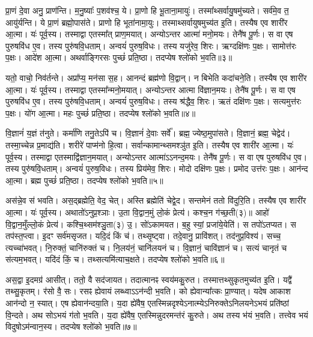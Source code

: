 प्रा॒णं दे॒वा अनु॒ प्राण॑न्ति। 
म॒नु॒ष्याः᳚ प॒शव॑श्च॒ ये। 
प्रा॒णो हि भू॒ताना॒मायुः॑। 
तस्मा᳚थ्सर्वायु॒षमु॑च्यते। 
सर्व॑मे॒व त॒ आयु॑र्\mbox{}यन्ति। 
ये प्रा॒णं ब्रह्मो॒पास॑ते। 
प्राणो हि भूता॑नामा॒युः। 
तस्माथ्सर्वायुषमुच्य॑त इ॒ति। 
तस्यैष एव शारी॑र आ॒त्मा। 
यः॑ पूर्व॒स्य। 
तस्माद्वा एतस्मा᳚त् प्राण॒मयात्। 
अन्योऽन्तर आत्मा॑ मनो॒मयः। 
तेनै॑ष पू॒र्णः। 
स वा एष पुरुषवि॑ध ए॒व। 
तस्य पुरु॑षवि॒धताम्। 
अन्वयं॑ पुरुष॒विधः। 
तस्य यजु॑रेव॒ शिरः। 
ऋग्दक्षि॑णः प॒क्षः। 
सामोत्त॑रः प॒क्षः। 
आदे॑श आ॒त्मा। 
अथर्वाङ्गिरसः पुच्छं॑ प्रति॒ष्ठा। 
तदप्येष श्लो॑को भ॒वति॥३॥

यतो॒ वाचो॒ निव॑र्तन्ते। 
अप्रा᳚प्य॒ मन॑सा स॒ह। 
आनन्दं ब्रह्म॑णो वि॒द्वान्। 
न बिभेति कदा॑चने॒ति। 
तस्यैष एव शारी॑र आ॒त्मा। 
यः॑ पूर्व॒स्य। 
तस्माद्वा एतस्मा᳚न्मनो॒मयात्। 
अन्योऽन्तर आत्मा वि॑ज्ञान॒मयः। 
तेनै॑ष पू॒र्णः। 
स वा एष पुरुषवि॑ध ए॒व। 
तस्य पुरु॑षवि॒धताम्। 
अन्वयं॑ पुरुष॒विधः। 
तस्य श्र॑द्धैव॒ शिरः। 
ऋतं दक्षि॑णः प॒क्षः। 
सत्यमुत्त॑रः प॒क्षः। 
यो॑ग आ॒त्मा। 
महः पुच्छं॑ प्रति॒ष्ठा। 
तदप्येष श्लो॑को भ॒वति॥४॥

वि॒ज्ञानं॑ य॒ज्ञं त॑नुते। 
कर्मा॑णि तनु॒तेऽपि॑ च। 
वि॒ज्ञानं॑ दे॒वाः सर्वे᳚। 
ब्रह्म॒ ज्येष्ठ॒मुपा॑सते। 
वि॒ज्ञानं॒ ब्रह्म॒ चेद्वेद॑। 
तस्मा॒च्चेन्न प्र॒माद्य॑ति। 
शरीरे॑ पाप्म॑नो हि॒त्वा। 
सर्वान्कामान्थ्समश्ञु॑त इ॒ति। 
तस्यैष एव शारी॑र आ॒त्मा। 
यः॑ पूर्व॒स्य। 
तस्माद्वा एतस्माद्वि॑ज्ञान॒मयात्। 
अन्योऽन्तर आत्मा॑ऽऽनन्द॒मयः। 
तेनै॑ष पू॒र्णः। 
स वा एष पुरुषवि॑ध ए॒व। 
तस्य पुरु॑षवि॒धताम्। 
अन्वयं॑ पुरुष॒विधः। 
तस्य प्रिय॑मेव॒ शिरः। 
मोदो दक्षि॑णः प॒क्षः। 
प्रमोद उत्त॑रः प॒क्षः। 
आन॑न्द आ॒त्मा। 
ब्रह्म पुच्छं॑ प्रति॒ष्ठा। 
तदप्येष श्लो॑को भ॒वति॥५॥

अस॑न्ने॒व स॑ भवति। 
अस॒द्ब्रह्मेति॒ वेद॒ चेत्। 
अस्ति ब्रह्मेति॑ चेद्वे॒द। 
सन्तमेनं ततो वि॑दुरि॒ति। 
तस्यैष एव शारी॑र आ॒त्मा। 
यः॑ पूर्व॒स्य। 
अथातो॑ऽनुप्र॒श्ञाः। 
उ॒ता वि॒द्वान॒मुं लो॒कं प्रेत्य॑। 
कश्च॒न ग॑च्छ॒ती(३)॥ आहो॑ वि॒द्वान॒मुँल्लो॒कं प्रेत्य॑। 
कश्चि॒थ्सम॑श्ञु॒ता(३) उ॒। 
सो॑ऽकामयत। 
ब॒हु स्यां॒ प्रजा॑ये॒येति॑। 
स तपो॑ऽतप्यत। 
स तप॑स्त॒प्त्वा। 
इ॒दꣳ सर्व॑मसृजत। 
यदि॒दं किं च॑। 
तथ्सृ॒ष्ट्वा। 
तदे॒वानु॒ प्रावि॑शत्। 
तद॑नुप्र॒विश्य॑। 
सच्च॒ त्यच्चा॑भवत्। 
नि॒रुक्तं॒ चानि॑रुक्तं च। 
नि॒लय॑नं॒ चानि॑लयनं च। 
वि॒ज्ञानं॒ चावि॑ज्ञानं च। 
सत्यं चानृतं च स॑त्यम॒भवत्। 
यदि॑दं किं॒ च। 
तथ्सत्यमि॑त्याच॒क्षते। 
तदप्येष श्लो॑को भ॒वति॥६॥

अस॒द्वा इ॒दमग्र॑ आसीत्। 
ततो॒ वै सद॑जायत। 
तदात्मानꣴ स्वय॑मकु॒रुत। 
तस्मात्तथ्सुकृतमुच्य॑त इ॒ति। 
यद्वै॑ तथ्सु॒कृतम्। 
र॑सो वै॒ सः। 
रसꣴ ह्येवायं लब्ध्वाऽऽन॑न्दी भ॒वति। 
को ह्येवान्या᳚त्कः प्रा॒ण्यात्। 
यदेष आकाश आन॑न्दो न॒ स्यात्। 
एष ह्येवान॑न्दया॒ति। 
य॒दा ह्ये॑वैष॒ एतस्मिन्नदृश्येऽनात्म्येऽनिरुक्तेऽनिलयनेऽभयं प्रति॑ष्ठां वि॒न्दते। 
अथ सोऽभयं ग॑तो भ॒वति। 
य॒दा ह्ये॑वैष॒ एतस्मिन्नुदरमन्त॑रं कु॒रुते। 
अथ तस्य भ॑यं भ॒वति। 
तत्त्वेव भयं विदुषोऽम॑न्वान॒स्य। 
तदप्येष श्लो॑को भ॒वति॥७॥

